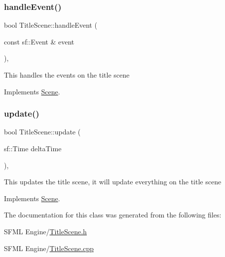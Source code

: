 \subsubsection{\texorpdfstring{handle\+Event()}{handleEvent()}}
{\footnotesize\ttfamily bool Title\+Scene\+::handle\+Event (\begin{DoxyParamCaption}\item[{const sf\+::\+Event \&}]{event }\end{DoxyParamCaption})\hspace{0.3cm}{\ttfamily [override]}, {\ttfamily [virtual]}}

This handles the events on the title scene 

Implements \hyperlink{class_scene_af25e4d2c998aca4e95899fb67488e815}{Scene}.

\mbox{\label{class_title_scene_a17ce1b5b9f6f8ca44a6ed3326e9e5d0a}} 
\subsubsection{\texorpdfstring{update()}{update()}}
{\footnotesize\ttfamily bool Title\+Scene\+::update (\begin{DoxyParamCaption}\item[{sf\+::\+Time}]{delta\+Time }\end{DoxyParamCaption})\hspace{0.3cm}{\ttfamily [override]}, {\ttfamily [virtual]}}

This updates the title scene, it will update everything on the title scene 

Implements \hyperlink{class_scene_a72683c984a1da2ce4f757705e93730f2}{Scene}.



The documentation for this class was generated from the following files\+:\begin{DoxyCompactItemize}
\item 
S\+F\+M\+L Engine/\hyperlink{_title_scene_8h}{Title\+Scene.\+h}\item 
S\+F\+M\+L Engine/\hyperlink{_title_scene_8cpp}{Title\+Scene.\+cpp}\end{DoxyCompactItemize}
